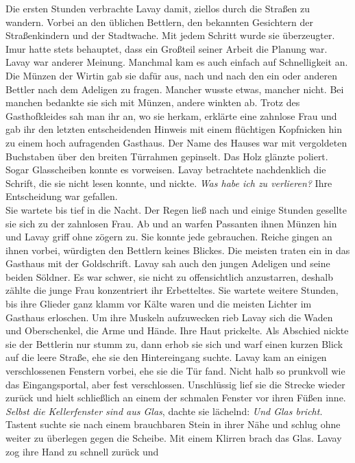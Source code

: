 Die ersten Stunden verbrachte Lavay damit, ziellos durch die Straßen zu wandern. Vorbei an den 
üblichen Bettlern, den bekannten Gesichtern der Straßenkindern und der Stadtwache. Mit jedem 
Schritt wurde sie überzeugter. Imur hatte stets behauptet, dass ein Großteil seiner Arbeit die 
Planung war. Lavay war anderer Meinung. Manchmal kam es auch einfach auf Schnelligkeit an. Die 
Münzen der Wirtin gab sie dafür aus, nach und nach den ein oder anderen Bettler nach dem Adeligen 
zu fragen. Mancher wusste etwas, mancher nicht. Bei manchen bedankte sie sich mit Münzen, andere 
winkten ab. Trotz des Gasthofkleides sah man ihr an, wo sie herkam, erklärte eine zahnlose Frau und 
gab ihr den letzten entscheidenden Hinweis mit einem flüchtigen Kopfnicken hin zu einem hoch 
aufragenden Gasthaus. Der Name des Hauses war mit vergoldeten Buchstaben über den breiten Türrahmen 
gepinselt. Das Holz glänzte poliert. Sogar Glasscheiben konnte es vorweisen. Lavay betrachtete 
nachdenklich die Schrift, die sie nicht lesen konnte, und nickte. \textit{Was habe ich zu 
verlieren?} 
Ihre Entscheidung war gefallen.\\
Sie wartete bis tief in die Nacht. Der Regen ließ nach und einige Stunden gesellte sie sich zu der 
zahnlosen Frau. Ab und an warfen Passanten ihnen Münzen hin und Lavay griff ohne zögern zu. Sie 
konnte jede gebrauchen. Reiche gingen an ihnen vorbei, würdigten den Bettlern keines Blickes. Die 
meisten traten ein in das Gasthaus mit der Goldschrift. Lavay sah auch den jungen Adeligen und 
seine beiden Söldner. Es war schwer, sie nicht zu offensichtlich anzustarren, deshalb zählte die 
junge Frau konzentriert ihr Erbetteltes. Sie wartete weitere Stunden, bis ihre Glieder ganz klamm 
vor Kälte waren und die meisten Lichter im Gasthaus erloschen. Um ihre Muskeln aufzuwecken rieb 
Lavay sich die Waden und Oberschenkel, die Arme und Hände. Ihre Haut prickelte. Als Abschied nickte 
sie der Bettlerin nur stumm zu, dann erhob sie sich und warf einen kurzen Blick auf die leere 
Straße, ehe sie den Hintereingang suchte. Lavay kam an einigen verschlossenen Fenstern vorbei, ehe 
sie die Tür fand. Nicht halb so prunkvoll wie das Eingangsportal, aber fest verschlossen. 
Unschlüssig lief sie die Strecke wieder zurück und hielt schließlich an einem der schmalen Fenster 
vor ihren Füßen inne. \textit{Selbst die Kellerfenster sind aus Glas}, dachte sie lächelnd: 
\textit{Und Glas bricht.}\\
Tastent suchte sie nach einem brauchbaren Stein in ihrer Nähe und schlug ohne weiter zu überlegen 
gegen die Scheibe. Mit einem Klirren brach das Glas. Lavay zog ihre Hand zu schnell zurück und 

